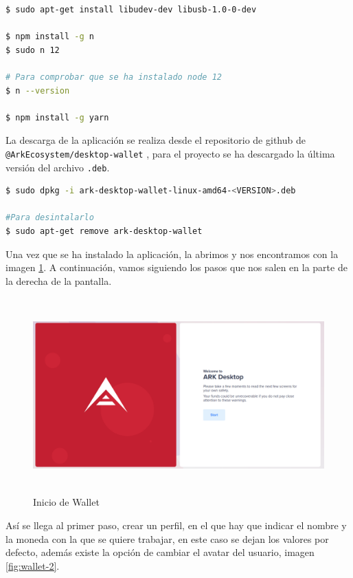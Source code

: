 \begin{lstlisting}[language=Bash,caption=Instalaciones previas a la aplicación ARK Wallet, label=cod:install-wallet, style=Consola]
$ sudo apt-get install libudev-dev libusb-1.0-0-dev

$ npm install -g n
$ sudo n 12

# Para comprobar que se ha instalado node 12
$ n --version

$ npm install -g yarn
\end{lstlisting}

La descarga de la aplicación se realiza desde el repositorio de github de \texttt{@ArkEcosystem/desktop-wallet} \cite{descargas-wallet}, para el proyecto se ha descargado la última versión del archivo \texttt{.deb}.

\begin{lstlisting}[language=Bash,caption=Instalación de la aplicación ARK Wallet, label=cod:install-wallet, style=Consola]
$ sudo dpkg -i ark-desktop-wallet-linux-amd64-<VERSION>.deb

#Para desintalarlo
$ sudo apt-get remove ark-desktop-wallet
\end{lstlisting}


Una vez que se ha instalado la aplicación, la abrimos y nos encontramos con la imagen \ref{fig:wallet-1}. A continuación, vamos siguiendo los pasos que nos salen en la parte de la derecha de la pantalla.

\begin{figure}[H]
	\centering
	\includegraphics[width=13.5cm,height=7.5cm]{figuras/wallet_1.png}
	\caption{Inicio de Wallet}
	\label{fig:wallet-1}
\end{figure}

\newpage
Así se llega al primer paso, crear un perfil, en el que hay que indicar el nombre y la moneda con la que se quiere trabajar, en este caso se dejan los valores por defecto, además existe la opción de cambiar el avatar del usuario, imagen \ref{fig:wallet-2}.


